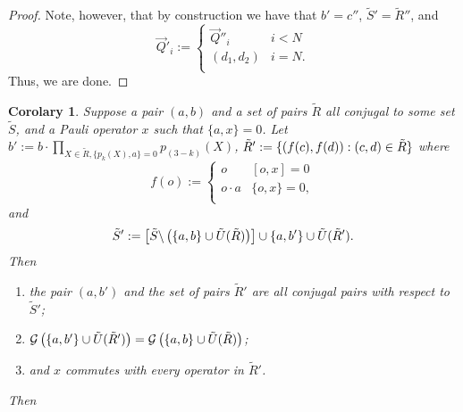 \documentclass[twocolumn,showpacs,preprintnumbers,amsmath,amssymb,nofootinbib,pra,floatfix]{revtex4-1}
\newtheorem{corolary}{Corolary}
\newcommand{\lst}{\vec}
\newcommand{\set}{\tilde}
\newcommand{\genfun}{\mathcal{G}}
\begin{document}
\begin{proof}
Note, however, that by construction we have that $b'=c''$, $\set S'=\set R''$, and
$$\lst Q'_i :=
\begin{cases}
\lst Q''_i & i < N \\
(d_1,d_2) & i = N.\\
\end{cases}
$$
Thus, we are done.
\end{proof}
\begin{corolary}
\label{recombination-to-make-commute}
Suppose a pair $(a,b)$ and a set of pairs $\set R$ all conjugal to some set $\set S$, and a Pauli operator $x$ such that $\{a,x\}=0$.  Let $b' := b\cdot \prod_{X\in\set R, \{p_k(X),a\}=0} p_{(3-k)}(X)$, $\set R':=\{\paren{f(c),f(d)}: (c,d)\in\set R\}$ where
$$
f(o) :=
\begin{cases}
o & [o,x]=0 \\
o\cdot a & \{o,x\}=0, \\
\end{cases}
$$
and
$$\set S' := \left[\set S\backslash\paren{\{a,b\} \cup \set U(\set R)}\right]\cup \{a,b'\} \cup \set U(\set R').$$
Then
\begin{enumerate}
\item the pair $(a,b')$ and the set of pairs $\set R'$ are all conjugal pairs with respect to $\set S'$;
\item $\genfun\paren{\{a,b'\}\cup \set U(\set R')}=\genfun\paren{\{a,b\}\cup \set U(\set R)}$;
\item and $x$ commutes with every operator in $\set R'$.
\end{enumerate}
Then
\end{corolary}
\end{document}

